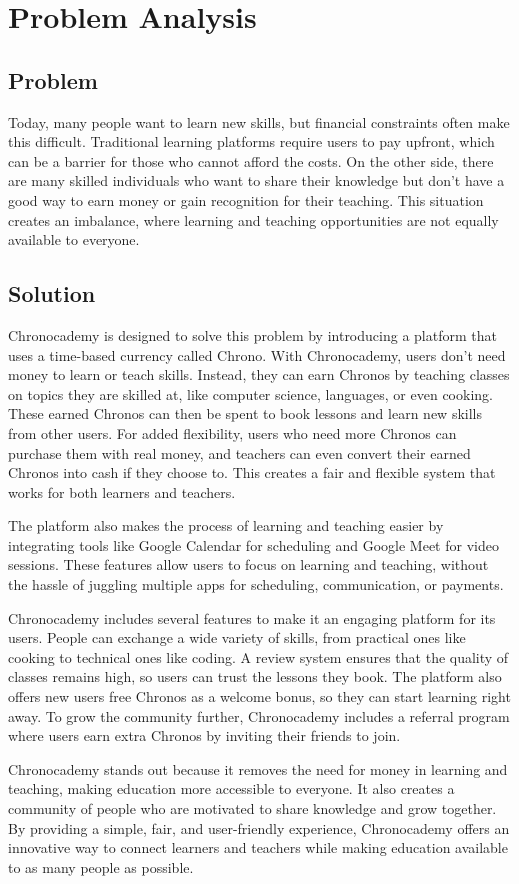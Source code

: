 \section{Problem Analysis}\label{sec:problem-analisys}

\subsection{Problem}\label{subsec:problem}
Today, many people want to learn new skills, but financial constraints often make this difficult.
Traditional learning platforms require users to pay upfront, which can be a barrier for those who cannot afford the costs.
On the other side, there are many skilled individuals who want to share their knowledge but don’t have a good way to earn money or gain recognition for their teaching.
This situation creates an imbalance, where learning and teaching opportunities are not equally available to everyone.

\subsection{Solution}\label{subsec:solution}
Chronocademy is designed to solve this problem by introducing a platform that
uses a time-based currency called Chrono.
With Chronocademy, users don’t need money to learn or teach skills.
Instead, they can earn Chronos by teaching classes on topics they are skilled at, like computer science, languages, or even cooking.
These earned Chronos can then be spent to book lessons and learn new
skills from other users.
For added flexibility, users who need more Chronos can purchase them with real money, and teachers can even convert their earned
Chronos into cash if they choose to.
This creates a fair and flexible system
that works for both learners and teachers.

The platform also makes the process of learning and teaching easier by integrating tools like Google Calendar for scheduling and Google Meet for video sessions.
These features allow users to focus on learning and teaching, without the hassle of juggling multiple apps for scheduling, communication, or payments.

Chronocademy includes several features to make it an engaging platform for its
users.
People can exchange a wide variety of skills, from practical ones like
cooking to technical ones like coding.
A review system ensures that the quality of classes remains high, so users can trust the lessons they book.
The platform also offers new users free Chronos as a welcome bonus, so
they can start learning right away.
To grow the community further,
Chronocademy includes a referral program where users earn extra Chronos by
inviting their friends to join.

Chronocademy stands out because it removes the need for money in learning and teaching, making education more accessible to everyone.
It also creates a community of people who are motivated to share knowledge and grow together.
By providing a simple, fair, and user-friendly experience, Chronocademy offers an innovative way to connect learners and teachers while making education available to as many people as possible.